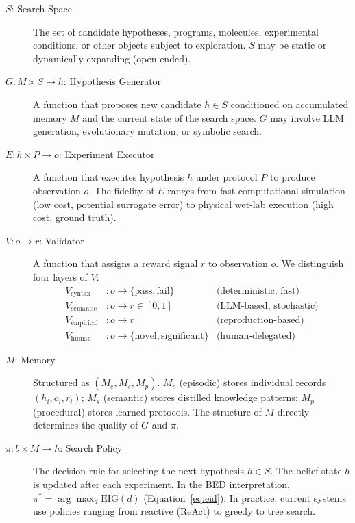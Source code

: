 \documentclass{article}
\begin{document}
\begin{description}
  \item[$S$: Search Space] The set of candidate hypotheses, programs, molecules, experimental conditions, or other objects subject to exploration. $S$ may be static or dynamically expanding (open-ended).

  \item[$G: M \times S \rightarrow h$: Hypothesis Generator] A function that proposes new candidate $h \in S$ conditioned on accumulated memory $M$ and the current state of the search space. $G$ may involve LLM generation, evolutionary mutation, or symbolic search.

  \item[$E: h \times P \rightarrow o$: Experiment Executor] A function that executes hypothesis $h$ under protocol $P$ to produce observation $o$. The fidelity of $E$ ranges from fast computational simulation (low cost, potential surrogate error) to physical wet-lab execution (high cost, ground truth).

  \item[$V: o \rightarrow r$: Validator] A function that assigns a reward signal $r$ to observation $o$. We distinguish four layers of $V$:
    \begin{align*}
      V_\text{syntax}   &: o \rightarrow \{\text{pass}, \text{fail}\} & \text{(deterministic, fast)}\\
      V_\text{semantic} &: o \rightarrow r \in [0,1]                  & \text{(LLM-based, stochastic)}\\
      V_\text{empirical}&: o \rightarrow r                            & \text{(reproduction-based)}\\
      V_\text{human}    &: o \rightarrow \{\text{novel}, \text{significant}\} & \text{(human-delegated)}
    \end{align*}

  \item[$M$: Memory] Structured as $(M_e, M_s, M_p)$. $M_e$ (episodic) stores individual records $(h_i, o_i, r_i)$; $M_s$ (semantic) stores distilled knowledge patterns; $M_p$ (procedural) stores learned protocols. The structure of $M$ directly determines the quality of $G$ and $\pi$.

  \item[$\pi: b \times M \rightarrow h$: Search Policy] The decision rule for selecting the next hypothesis $h \in S$. The belief state $b$ is updated after each experiment. In the BED interpretation, $\pi^* = \arg\max_d \mathrm{EIG}(d)$ (Equation~\ref{eq:eid}). In practice, current systems use policies ranging from reactive (ReAct) to greedy to tree search.
\end{description}
\end{document}
